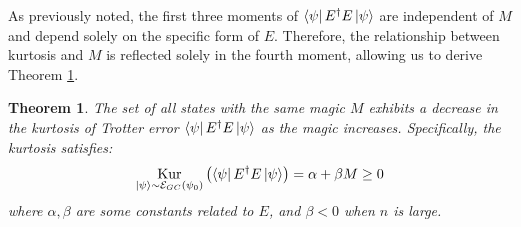 \documentclass[showpacs,amsmath,amssymb,twocolumn,aps,pra,superscriptaddress,notitlepage,10pt]{revtex4-2}
\newcommand{\cM}{\mathcal E_{GC}}
\newtheorem{theorem}{Theorem}
\begin{document}
As previously noted, the first three moments of $\bra{\psi}E^\dagger E\ket{\psi}$ are independent of $M$ and depend solely on the specific form of $E$. Therefore, the relationship between kurtosis and $M$ is reflected solely in the fourth moment, allowing us to derive Theorem \ref{theo:formerkurtosis}.
\begin{theorem}\label{theo:formerkurtosis}
    The set of all states with the same magic $M$ exhibits a decrease in the kurtosis of Trotter error $\bra{\psi}E^\dagger E\ket{\psi}$ as the magic increases. Specifically, the kurtosis satisfies:
    \begin{equation*}
        \mathop{\mathrm{Kur}}_{\ket{\psi}\sim\cM(\psi_0)}\left(\bra{\psi}E^\dagger E\ket{\psi}\right)=\alpha +\beta M\ge0
    \end{equation*}
    where $\alpha,\beta$ are some constants related to $E$, and $\beta<0$ when $n$ is large.
\end{theorem}
\end{document}
